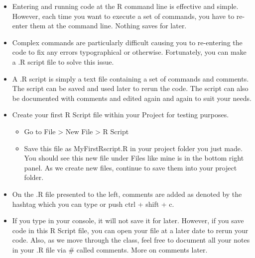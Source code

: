 \documentclass[
  letterpaper,
  DIV=11,
  numbers=noendperiod]{scrreprt}
\providecommand{\tightlist}{%
  \setlength{\itemsep}{0pt}\setlength{\parskip}{0pt}}\usepackage{longtable,booktabs,array}
\begin{document}
\begin{itemize}
\tightlist
\item
  Entering and running code at the R command line is effective and
  simple. However, each time you want to execute a set of commands, you
  have to re-enter them at the command line. Nothing saves for later.
\item
  Complex commands are particularly difficult causing you to re-entering
  the code to fix any errors typographical or otherwise. Fortunately,
  you can make a .R script file to solve this issue.
\item
  A .R script is simply a text file containing a set of commands and
  comments. The script can be saved and used later to rerun the code.
  The script can also be documented with comments and edited again and
  again to suit your needs.\\
\item
  Create your first R Script file within your Project for testing
  purposes.

  \begin{itemize}
  \tightlist
  \item
    Go to File \textgreater{} New File \textgreater{} R Script
  \item
    Save this file as MyFirstRscript.R in your project folder you just
    made. You should see this new file under Files like mine is in the
    bottom right panel. As we create new files, continue to save them
    into your project folder.
  \end{itemize}
\item
  On the .R file presented to the left, comments are added as denoted by
  the hashtag which you can type or push ctrl + shift + c.~
\item
  If you type in your console, it will not save it for later. However,
  if you save code in this R Script file, you can open your file at a
  later date to rerun your code. Also, as we move through the class,
  feel free to document all your notes in your .R file via \# called
  comments. More on comments later.
\end{itemize}
\end{document}
